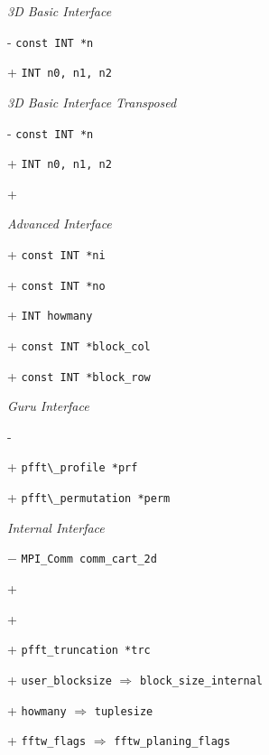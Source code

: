 \emph{3D Basic Interface}
\begin{compactitem}
  \item[-] \verb+const INT *n+
  \item[+] \verb+INT n0, n1, n2+
\end{compactitem}

\emph{3D Basic Interface Transposed}
\begin{compactitem}
  \item[-] \verb+const INT *n+
  \item[+] \verb+INT n0, n1, n2+
  \item[+] 
\end{compactitem}

\emph{Advanced Interface}
\begin{compactitem}
  \item[+] \verb+const INT *ni+
  \item[+] \verb+const INT *no+
  \item[+] \verb+INT howmany+
  \item[+] \verb+const INT *block_col+
  \item[+] \verb+const INT *block_row+
\end{compactitem}

\emph{Guru Interface}
\begin{compactitem}
  \item[-] 
  \item[+] \verb+pfft\_profile *prf+
  \item[+] \verb+pfft\_permutation *perm+
\end{compactitem}

\emph{Internal Interface}
\begin{compactitem}
  \item[$-$] \verb+MPI_Comm comm_cart_2d+
  \item[+] 
  \item[+] 
  \item[+] \verb+pfft_truncation *trc+
  \item[+] \verb+user_blocksize+ $\Rightarrow$ \verb+block_size_internal+
  \item[+] \verb+howmany+ $\Rightarrow$ \verb+tuplesize+
  \item[+] \verb+fftw_flags+ $\Rightarrow$ \verb+fftw_planing_flags+
\end{compactitem}


\newcommand{\redlst}[1]{\lstinline+#1+}

